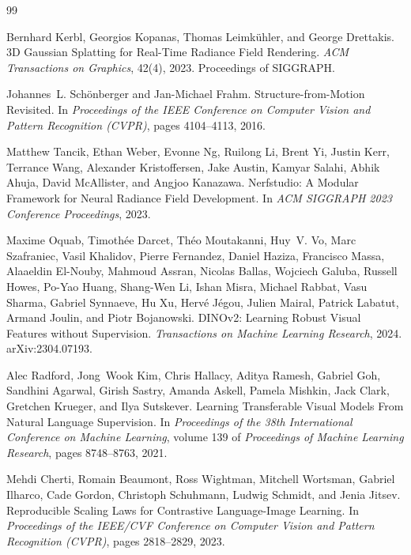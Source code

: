 \documentclass[10pt,letterpaper]{article}
\DeclareRobustCommand{\_}{\textunderscore\allowbreak}
\begin{document}
\begin{thebibliography}{99}

Bernhard Kerbl, Georgios Kopanas, Thomas Leimk{\"u}hler, and George Drettakis.
3D Gaussian Splatting for Real-Time Radiance Field Rendering.
\textit{ACM Transactions on Graphics}, 42(4), 2023.
Proceedings of SIGGRAPH.

Johannes~L. Sch{\"o}nberger and Jan-Michael Frahm.
Structure-from-Motion Revisited.
In \textit{Proceedings of the IEEE Conference on Computer Vision and Pattern Recognition (CVPR)}, pages 4104--4113, 2016.

Matthew Tancik, Ethan Weber, Evonne Ng, Ruilong Li, Brent Yi, Justin Kerr, Terrance Wang, Alexander Kristoffersen, Jake Austin, Kamyar Salahi, Abhik Ahuja, David McAllister, and Angjoo Kanazawa.
Nerfstudio: A Modular Framework for Neural Radiance Field Development.
In \textit{ACM SIGGRAPH 2023 Conference Proceedings}, 2023.

Maxime Oquab, Timoth{\'e}e Darcet, Th{\'e}o Moutakanni, Huy~V. Vo, Marc Szafraniec, Vasil Khalidov, Pierre Fernandez, Daniel Haziza, Francisco Massa, Alaaeldin El-Nouby, Mahmoud Assran, Nicolas Ballas, Wojciech Galuba, Russell Howes, Po-Yao Huang, Shang-Wen Li, Ishan Misra, Michael Rabbat, Vasu Sharma, Gabriel Synnaeve, Hu Xu, Herv{\'e} J{\'e}gou, Julien Mairal, Patrick Labatut, Armand Joulin, and Piotr Bojanowski.
DINOv2: Learning Robust Visual Features without Supervision.
\textit{Transactions on Machine Learning Research}, 2024.
arXiv:2304.07193.

Alec Radford, Jong~Wook Kim, Chris Hallacy, Aditya Ramesh, Gabriel Goh, Sandhini Agarwal, Girish Sastry, Amanda Askell, Pamela Mishkin, Jack Clark, Gretchen Krueger, and Ilya Sutskever.
Learning Transferable Visual Models From Natural Language Supervision.
In \textit{Proceedings of the 38th International Conference on Machine Learning}, volume 139 of \textit{Proceedings of Machine Learning Research}, pages 8748--8763, 2021.

Mehdi Cherti, Romain Beaumont, Ross Wightman, Mitchell Wortsman, Gabriel Ilharco, Cade Gordon, Christoph Schuhmann, Ludwig Schmidt, and Jenia Jitsev.
Reproducible Scaling Laws for Contrastive Language-Image Learning.
In \textit{Proceedings of the IEEE/CVF Conference on Computer Vision and Pattern Recognition (CVPR)}, pages 2818--2829, 2023.


\end{thebibliography}
\end{document}
